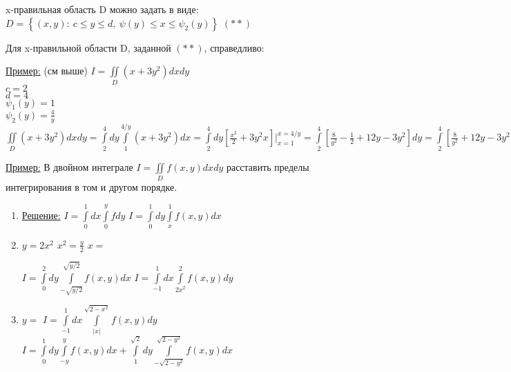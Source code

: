 x-правильная область D можно задать в виде:
$D = \left\{ (x,y): \  c \leqslant y \leqslant d, \ \psi(y) \leqslant x \leqslant \psi_2(y) \right\}$ $(**)$


Для x-правильной области D, заданной $(**)$, справедливо: 


\underline{Пример:}
(см выше)
$I = \iint\limits_{D} (x + 3y^2) dxdy$ \\

$c = 2$ \\
$d = 4$ \\
$\psi_1(y) = 1$ \\
$\psi_2(y) = \frac{4}{y}$ \\


$\iint\limits_{D} (x+ 3y^2)dxdy = 
\int\limits_{2}^{4} dy \int\limits_{1}^{4 \slash y} (x + 3y^2)dx = 
\int\limits_{2}^{4} dy \left[ \frac{x^2}{2} + 3y^2x \right] \bigg|_{x=1}^{x= 4 \slash y} = 
\int\limits_{2}^{4} \left[ \frac{8}{y^2} - \frac{1}{2} + 12y - 3y^2 \right] dy = 
\int\limits_{2}^{4} \left[ \frac{8}{y^2} + 12y - 3y^2 - \frac{1}{2} \right] dy = 
\left( -\frac{8}{y} + 6y^2 - y^3 \right) \bigg|_{2}^{4} - 1 = 
(-2 + 6 \cdot 16 - 4 \cdot 16) - (-4 +24 - 8) - 1 = 30 - 12 - 1 = 17$

\underline{Пример:} В двойном интеграле $I = \iint\limits_{D} f(x,y) dxdy$ расставить пределы интегрирования в том и другом порядке.
\begin{enumerate}
	\item[а)]
	
	\underline{Решение:} 
	$I = \int\limits_{0}^{1} dx \int\limits_{0}^{y} f dy$
	$I = \int\limits_{0}^{1} dy \int\limits_{x}^{1} f(x,y) dx$
	
	\item[б)]
	$y = 2x^2$
	$x^2 = \frac{y}{2}$
	$x = $
	
	$I = \int\limits_{0}^{2} dy \int\limits_{-\sqrt{y \slash 2}}^{\sqrt{y \slash 2}} f(x,y) dx$
	$I = \int\limits_{-1}^{1} dx \int\limits_{2x^2}^{2} f(x,y) dy$
	
	\item[в)]
	$y = $
	$I = \int\limits_{-1}^{1} dx \int\limits_{|x|}^{\sqrt{2 - x^2}} f(x,y) dy$
	$I = \int\limits_{0}^{1} dy \int\limits_{-y}^{y} f(x,y) dx + \int\limits_{1}^{\sqrt{2}} dy \int \limits_{-\sqrt{2-y^2}}^{\sqrt{2 - y^2}} f(x,y) dx$
\end{enumerate}
 


















